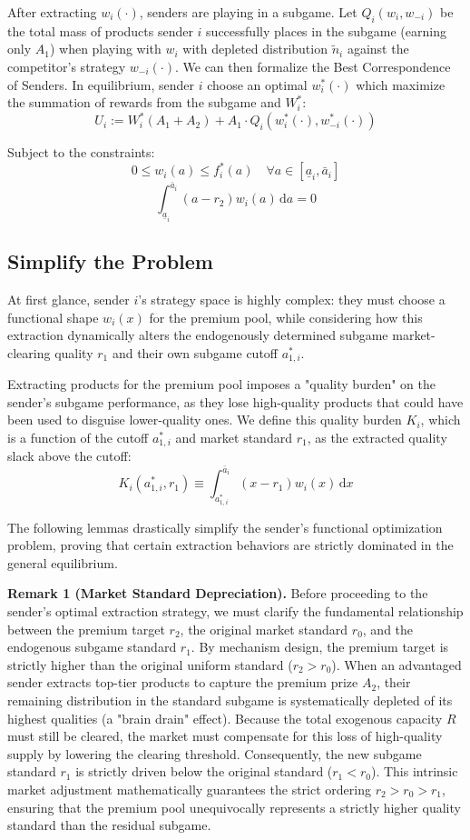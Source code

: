 \documentclass[12pt, a4paper]{article}
\begin{document}
After extracting $w_i(\cdot)$, senders are playing in a subgame. Let $Q_i(w_i,w_{-i})$ be the total mass of products sender $i$ successfully places in the subgame (earning only $A_1$) when playing with $w_i$ with depleted distribution $\tilde{n}_i$ against the competitor's strategy $w_{-i}(\cdot)$. We can then formalize the Best Correspondence of Senders. In equilibrium, sender $i$ choose an optimal $w^*_i(\cdot)$ which maximize the summation of rewards from the subgame and $W^*_i$:
$$ U_i:=W^*_i (A_1 + A_2) + A_1 \cdot Q_i(w^*_i(\cdot),w^*_{-i}(\cdot)) $$

Subject to the constraints:
$$ 0 \leq w_i(a) \leq f_i^*(a) \quad \forall a \in [\underline{a}_i, \bar{a}_i] $$
$$ \int_{\underline{a}_i}^{\bar{a}_i} (a - r_2) w_i(a) \, \mathrm{d}a = 0 $$
\subsection{Simplify the Problem}

At first glance, sender $i$'s strategy space is highly complex: they must choose a functional shape $w_i(x)$ for the premium pool, while considering how this extraction dynamically alters the endogenously determined subgame market-clearing quality $r_1$ and their own subgame cutoff $a_{1,i}^*$. 

Extracting products for the premium pool imposes a "quality burden" on the sender's subgame performance, as they lose high-quality products that could have been used to disguise lower-quality ones. We define this quality burden $K_i$, which is a function of the cutoff $a_{1,i}^*$ and market standard $r_1$, as the extracted quality slack above the cutoff:
\[
    K_i(a_{1,i}^*, r_1) \equiv \int_{a_{1,i}^*}^{\bar{a}_i} (x - r_1) w_i(x) \, \mathrm{d}x 
\]

The following lemmas drastically simplify the sender's functional optimization problem, proving that certain extraction behaviors are strictly dominated in the general equilibrium.

\textbf{Remark 1 (Market Standard Depreciation).} 
Before proceeding to the sender's optimal extraction strategy, we must clarify the fundamental relationship between the premium target $r_2$, the original market standard $r_0$, and the endogenous subgame standard $r_1$. By mechanism design, the premium target is strictly higher than the original uniform standard ($r_2 > r_0$). When an advantaged sender extracts top-tier products to capture the premium prize $A_2$, their remaining distribution in the standard subgame is systematically depleted of its highest qualities (a "brain drain" effect). Because the total exogenous capacity $R$ must still be cleared, the market must compensate for this loss of high-quality supply by lowering the clearing threshold. Consequently, the new subgame standard $r_1$ is strictly driven below the original standard ($r_1 < r_0$). This intrinsic market adjustment mathematically guarantees the strict ordering $r_2 > r_0 > r_1$, ensuring that the premium pool unequivocally represents a strictly higher quality standard than the residual subgame.
\end{document}
